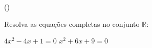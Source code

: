 \begin{question}[type=exam] () %

 Resolva as equações completas no conjunto $\mathbb{R}$:
\begin{tasks}
        \task $4x^2-4x+1=0$
        \task $x^2+6x+9=0$
    \end{tasks}
\end{question}
